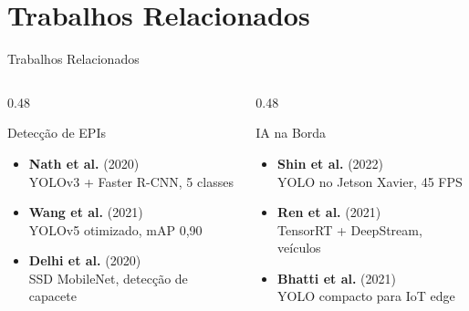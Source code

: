 
\section{Trabalhos Relacionados}

\begin{frame}{Trabalhos Relacionados}
  \vfill

  \begin{columns}[T]
    \begin{column}{0.48\textwidth}
      {
      \begin{block}{\centering Detec\c{c}\~{a}o de EPIs}
        \smallskip
        \begin{itemize}\small
          \item[\color{inputcolor}$\blacktriangleright$] \textbf{Nath et al.} (2020)\\
            {\scriptsize YOLOv3 + Faster R-CNN, 5 classes}
          \item[\color{inputcolor}$\blacktriangleright$] \textbf{Wang et al.} (2021)\\
            {\scriptsize YOLOv5 otimizado, mAP 0,90}
          \item[\color{inputcolor}$\blacktriangleright$] \textbf{Delhi et al.} (2020)\\
            {\scriptsize SSD MobileNet, detec\c{c}\~{a}o de capacete}
        \end{itemize}
        \smallskip
      \end{block}
      }
    \end{column}
    \begin{column}{0.48\textwidth}
      {
      \begin{block}{\centering IA na Borda}
        \smallskip
        \begin{itemize}\small
          \item[\color{neckcolor}$\blacktriangleright$] \textbf{Shin et al.} (2022)\\
            {\scriptsize YOLO no Jetson Xavier, 45 FPS}
          \item[\color{neckcolor}$\blacktriangleright$] \textbf{Ren et al.} (2021)\\
            {\scriptsize TensorRT + DeepStream, ve\'{i}culos}
          \item[\color{neckcolor}$\blacktriangleright$] \textbf{Bhatti et al.} (2021)\\
            {\scriptsize YOLO compacto para IoT edge}
        \end{itemize}
        \smallskip
      \end{block}
      }
    \end{column}
  \end{columns}


\end{frame}
